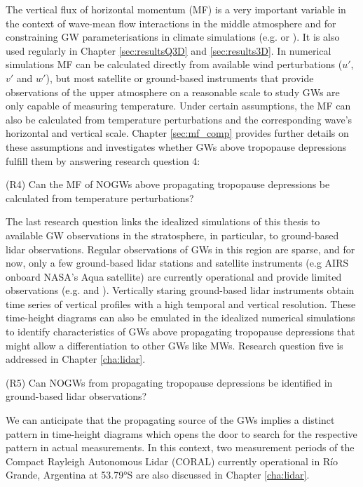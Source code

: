 The vertical flux of horizontal momentum (MF) is a very important variable in the context of wave-mean flow interactions in the middle atmosphere and for constraining GW parameterisations in climate simulations (e.g. \cite[]{geller_comparison_2013} or \cite[]{kim_overview_2003}). It is also used regularly in Chapter \ref{sec:resultsQ3D} and \ref{sec:results3D}. In numerical simulations MF can be calculated directly from available wind perturbations ($u'$,$v'$ and $w'$), but most satellite or ground-based instruments that provide observations of the upper atmosphere on a reasonable scale to study GWs are only capable of measuring temperature. Under certain assumptions, the MF can also be calculated from temperature perturbations and the corresponding wave's horizontal and vertical scale. Chapter \ref{sec:mf_comp} provides further details on these assumptions and investigates whether GWs above tropopause depressions fulfill them by answering research question 4:
\begin{tcolorbox}[]
    (R4) Can the MF of NOGWs above propagating tropopause depressions be calculated from temperature perturbations?
\end{tcolorbox}

The last research question links the idealized simulations of this thesis to available GW observations in the stratosphere, in particular, to ground-based lidar observations. Regular observations of GWs in this region are sparse, and for now, only a few ground-based lidar stations and satellite instruments (e.g AIRS onboard NASA's Aqua satellite) are currently operational and provide limited observations (e.g. \cite[]{kaifler_compact_2021} and \cite[]{hindley_18year_2020}). Vertically staring ground-based lidar instruments obtain time series of vertical profiles with a high temporal and vertical resolution. These time-height diagrams can also be emulated in the idealized numerical simulations to identify characteristics of GWs above propagating tropopause depressions that might allow a differentiation to other GWs like MWs. Research question five is addressed in Chapter \ref{cha:lidar}.
\begin{tcolorbox}[]
    (R5) Can NOGWs from propagating tropopause depressions be identified in ground-based lidar observations?
\end{tcolorbox}
We can anticipate that the propagating source of the GWs implies a distinct pattern in time-height diagrams which opens the door to search for the respective pattern in actual measurements. In this context, two measurement periods of the Compact Rayleigh Autonomous Lidar (CORAL) currently operational in Río Grande, Argentina at 53.79°S are also discussed in Chapter \ref{cha:lidar}.


